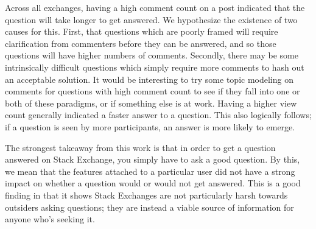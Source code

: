 \documentclass[12pt]{article}
\begin{document}
Across all exchanges, having a high comment count on a post indicated that the question will take longer to get answered. We hypothesize the existence of two causes for this. First, that questions which are poorly framed will require clarification from commenters before they can be answered, and so those questions will have higher numbers of comments. Secondly, there may be some intrinsically difficult questions which simply require more comments to hash out an acceptable solution. It would be interesting to try some topic modeling on comments for questions with high comment count to see if they fall into one or both of these paradigms, or if something else is at work. Having a higher view count generally indicated a faster answer to a question. This also logically follows; if a question is seen by more participants, an answer is more likely to emerge. 

The strongest takeaway from this work is that in order to get a question answered on Stack Exchange, you simply have to ask a good question. By this, we mean that the features attached to a particular user did not have a strong impact on whether a question would or would not get answered. This is a good finding in that it shows Stack Exchanges are not particularly harsh towards outsiders asking questions; they are instead a viable source of information for anyone who's seeking it. 


\printbibliography


\end{document}
